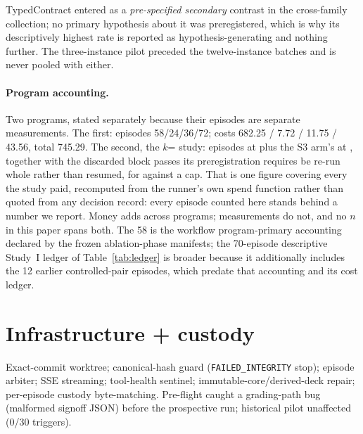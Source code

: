 \documentclass{article}
\begin{document}
\noindent TypedContract entered as a \emph{pre-specified secondary} contrast in the cross-family collection; no primary hypothesis about it was preregistered, which is why its descriptively highest rate is reported as hypothesis-generating and nothing further. The three-instance pilot preceded the twelve-instance batches and is never pooled with either.

\paragraph{Program accounting.} Two programs, stated separately because their episodes are separate measurements. The first: episodes 58/24/36/72; costs \textyen{}682.25 / \textyen{}7.72 / \textyen{}11.75 / \textyen{}43.56, total \textyen{}745.29. The second, the $k$=\StatEightAK{} study: \StatEightAEpisodes{} episodes at \textyen{}\StatEightASpend{} plus the S3 arm's \StatArmTwoEpisodes{} at \textyen{}\StatArmTwoSpend{}, together with the discarded block passes its preregistration requires be re-run whole rather than resumed, for \textyen{}\StatEightAProgramme{} against a \textyen{}\StatEightACap{} cap. That is one figure covering every \textyen{} the study paid, recomputed from the runner's own spend function rather than quoted from any decision record: every episode counted here stands behind a number we report. Money adds across programs; measurements do not, and no $n$ in this paper spans both. The 58 is the workflow program-primary accounting declared by the frozen ablation-phase manifests; the 70-episode descriptive Study~I ledger of Table~\ref{tab:ledger} is broader because it additionally includes the 12 earlier controlled-pair episodes, which predate that accounting and its cost ledger.

\section{Infrastructure + custody}
\label{app:infra}
Exact-commit worktree; canonical-hash guard (\texttt{FAILED\_INTEGRITY} stop); episode arbiter; SSE streaming; tool-health sentinel; immutable-core/derived-deck repair; per-episode custody byte-matching. Pre-flight caught a grading-path bug (malformed signoff JSON) before the prospective run; historical pilot unaffected (0/30 triggers).
\end{document}
